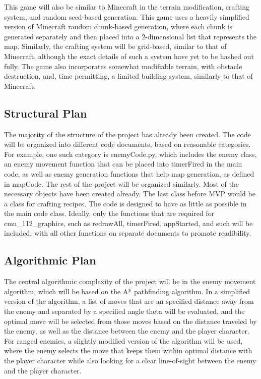 \documentclass[12pt]{article}
\begin{document}
This game will also be similar to Minecraft in the terrain modification, 
crafting system, and random seed-based generation. This game uses a heavily 
simplified version of Minecraft random chunk-based generation, where
each chunk is generated separately and then placed into a 2-dimensional
list that represents the map. Similarly, the crafting system will be 
grid-based, similar to that of Minecraft, although the exact details
of such a system have yet to be hashed out fully. The game also incorporates
somewhat modifiable terrain, with obstacle destruction, and, time permitting,
a limited building system, similarly to that of Minecraft.

\subsection{Structural Plan}
The majority of the structure of the project has already been created. 
The code will be organized into different code documents, based on 
reasonable categories. For example, one such category is enemyCode.py, 
which includes the enemy class, an enemy movement function that can 
be placed into timerFired in the main code, as well as enemy generation
functions that help map generation, as defined in mapCode. The rest of
the project will be organized similarly. Most of the necessary objects
have been created already. The last class before MVP would be a class
for crafting recipes. The code is designed to have as little as possible
in the main code class. Ideally, only the functions that are required for
cmu\_112\_graphics, such as redrawAll, timerFired, appStarted, and such
will be included, with all other functions on separate documents to 
promote readibility.

\subsection{Algorithmic Plan}
The central algorithmic complexity of the project will be in the enemy
movement algorithm, which will be based on the A* pathfinding algorithm.
In a simplified version of the algorithm, a list of moves that are an 
specified distance away from the enemy and separated by a specified angle
theta will be evaluated, and the optimal move will be selected from those
moves based on the distance traveled by the enemy, as well as the distance 
between the enemy and the player character. For ranged enemies, a 
slightly modified version of the algorithm will be used, where the 
enemy selects the move that keeps them within optimal distance with the
player character while also looking for a clear line-of-sight between
the enemy and the player character. 
\end{document}
